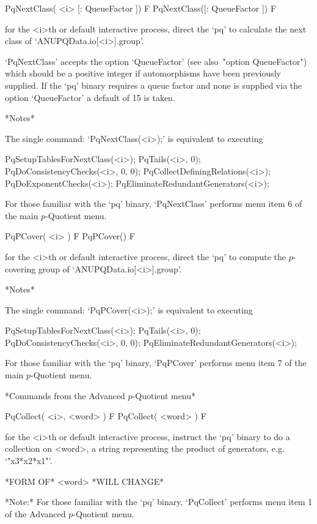 \>PqNextClass( <i> [: QueueFactor ]) F
\>PqNextClass([: QueueFactor ]) F

for the <i>th or default interactive {\ANUPQ} process, direct  the  `pq'
to calculate the next class of `ANUPQData.io[<i>].group'. 

`PqNextClass'  accepts  the  option   `QueueFactor'   (see   also~"option
QueueFactor") which should be a positive integer  if  automorphisms  have
been previously supplied. If the `pq' binary requires a queue factor  and
none is supplied via the option `QueueFactor' a default of 15 is taken.

*Notes*

The single command: `PqNextClass(<i>);' is equivalent to executing

PqSetupTablesForNextClass(<i>);
PqTails(<i>, 0);
PqDoConsistencyChecks(<i>, 0, 0);
PqCollectDefiningRelations(<i>);
PqDoExponentChecks(<i>);
PqEliminateRedundantGenerators(<i>);

For those familiar with the `pq' binary, `PqNextClass' performs menu item
6 of the main $p$-Quotient menu.

\>PqPCover( <i> ) F
\>PqPCover() F

for the <i>th or default interactive {\ANUPQ} process, direct the `pq' to
compute the $p$-covering group of `ANUPQData.io[<i>].group'.

*Notes*

The single command: `PqPCover(<i>);' is equivalent to executing

PqSetupTablesForNextClass(<i>);
PqTails(<i>, 0);
PqDoConsistencyChecks(<i>, 0, 0);
PqEliminateRedundantGenerators(<i>);

For those familiar with the `pq' binary, `PqPCover' performs menu item  7
of the main $p$-Quotient menu.

*Commands from the Advanced $p$-Quotient menu*

\>PqCollect( <i>, <word> ) F
\>PqCollect( <word> ) F

for the <i>th or default interactive {\ANUPQ} process, instruct the  `pq'
binary to do a collection on <word>, a string representing the product of
generators, e.g. `"x3*x2*x1"'.

*FORM OF* <word> *WILL CHANGE*

*Note:* For those familiar with the  `pq'  binary,  `PqCollect'  performs
menu item 1 of the Advanced $p$-Quotient menu.

